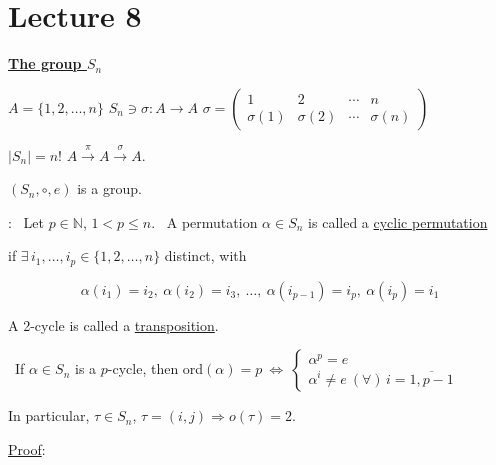 \bigskip

\section{Lecture 8}


\begin{center}
\end{center}
\begin{flushright}
\end{flushright}

\bigskip
\noindent\underline{\textbf{The group $S_n$}}

\bigskip
\noindent $A=\{1,2,\ldots,n\}$ \quad $S_n \ni \sigma: A\to A$ \quad $\sigma = \begin{pmatrix}1&2&\cdots&n\\ \sigma(1)&\sigma(2)&\cdots&\sigma(n)\end{pmatrix}$

\noindent $|S_n|=n!$ \qquad $A\xrightarrow{\ \pi\ }A\xrightarrow{\ \sigma\ }A.$

\bigskip
\noindent $(S_n,\circ,e)$ is a group.

\bigskip
\noindent{}: \ Let $p\in\mathbb{N}$, $1<p\leq n$. \ A permutation $\alpha\in S_n$ is called a \underline{cyclic permutation}

\noindent if $\exists\,i_1,\ldots,i_p\in\{1,2,\ldots,n\}$ distinct, with

\[
\alpha(i_1)=i_2, \ \alpha(i_2)=i_3, \ \ldots, \ \alpha(i_{p-1})=i_p, \ \alpha(i_p)=i_1
\]

\bigskip
\noindent A 2-cycle is called a \underline{transposition}.

\bigskip
\noindent{} \ If $\alpha\in S_n$ is a $p$-cycle, then ord$(\alpha)=p \ \Leftrightarrow \ \begin{cases}\alpha^p=e\\ \alpha^i\neq e \ (\forall)\,i=\overline{1,p-1}\end{cases}$

\bigskip
\noindent In particular, $\tau\in S_n$, $\tau=(i,j) \Rightarrow o(\tau)=2$.

\bigskip
\noindent\underline{Proof}:

